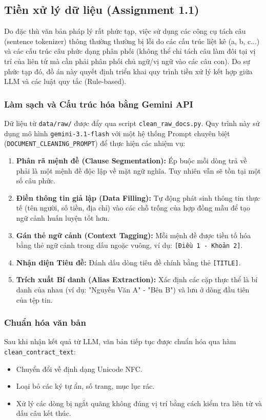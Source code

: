 \subsection{Tiền xử lý dữ liệu (Assignment 1.1)}

Do đặc thù văn bản pháp lý rất phức tạp, việc sử dụng các công cụ tách câu (sentence tokenizer) thông thường thường bị lỗi do các cấu trúc liệt kê (a, b, c...) và các cấu trúc câu phức dạng phân phối (không thể chỉ tách câu làm đôi tại vị trí của liên từ mà cần phải phân phối chủ ngữ/vị ngữ vào các câu con). Do sự phức tạp đó, đồ án này quyết định triển khai quy trình tiền xử lý kết hợp giữa LLM và các luật quy tắc (Rule-based).

\subsubsection{Làm sạch và Cấu trúc hóa bằng Gemini API}
Dữ liệu từ \texttt{data/raw/} được đẩy qua script \texttt{clean\_raw\_docs.py}. Quy trình này sử dụng mô hình \texttt{gemini-3.1-flash} với một hệ thống Prompt chuyên biệt (\texttt{DOCUMENT\_CLEANING\_PROMPT}) để thực hiện các nhiệm vụ:
\begin{enumerate}
    \item \textbf{Phân rã mệnh đề (Clause Segmentation):} Ép buộc mỗi dòng trả về phải là một mệnh đề độc lập về mặt ngữ nghĩa. Tuy nhiên vẫn sẽ tồn tại một số câu phức.
    \item \textbf{Điền thông tin giả lập (Data Filling):} Tự động phát sinh thông tin thực tế (tên người, số tiền, địa chỉ) vào các chỗ trống của hợp đồng mẫu để tạo ngữ cảnh huấn luyện tốt hơn.
    \item \textbf{Gán thẻ ngữ cảnh (Context Tagging):} Mỗi mệnh đề được tiền tố hóa bằng thẻ ngữ cảnh trong dấu ngoặc vuông, ví dụ: \texttt{[Điều 1 - Khoản 2]}.
    \item \textbf{Nhận diện Tiêu đề:} Đánh dấu dòng tiêu đề chính bằng thẻ \texttt{[TITLE]}.
    \item \textbf{Trích xuất Bí danh (Alias Extraction):} Xác định các cặp thực thể là bí danh của nhau (ví dụ: "Nguyễn Văn A" - "Bên B") và lưu ở dòng đầu tiên của tệp tin.
\end{enumerate}

\subsubsection{Chuẩn hóa văn bản}
Sau khi nhận kết quả từ LLM, văn bản tiếp tục được chuẩn hóa qua hàm \texttt{clean\_contract\_text}:
\begin{itemize}
    \item Chuyển đổi về định dạng Unicode NFC.
    \item Loại bỏ các ký tự ẩn, số trang, mục lục rác.
    \item Xử lý các dòng bị ngắt quãng không đúng vị trí bằng cách kiểm tra liên từ và dấu câu kết thúc.
\end{itemize}

